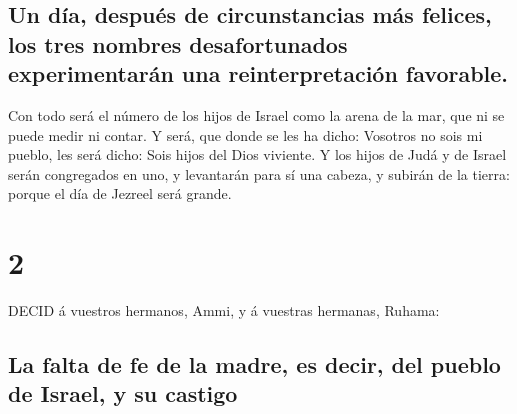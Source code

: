 \hypertarget{un-duxeda-despuuxe9s-de-circunstancias-muxe1s-felices-los-tres-nombres-desafortunados-experimentaruxe1n-una-reinterpretaciuxf3n-favorable.}{%
\subsection{Un día, después de circunstancias más felices, los tres
nombres desafortunados experimentarán una reinterpretación
favorable.}\label{un-duxeda-despuuxe9s-de-circunstancias-muxe1s-felices-los-tres-nombres-desafortunados-experimentaruxe1n-una-reinterpretaciuxf3n-favorable.}}

 Con todo será el número de los hijos de Israel como la
arena de la mar, que ni se puede medir ni contar. Y será, que donde se
les ha dicho: Vosotros no sois mi pueblo, les será dicho: Sois hijos del
Dios viviente.  Y los hijos de Judá y de Israel serán
congregados en uno, y levantarán para sí una cabeza, y subirán de la
tierra: porque el día de Jezreel será grande.

\hypertarget{section-1}{%
\section{2}\label{section-1}}

 DECID á vuestros hermanos, Ammi, y á vuestras hermanas,
Ruhama:

\hypertarget{la-falta-de-fe-de-la-madre-es-decir-del-pueblo-de-israel-y-su-castigo}{%
\subsection{La falta de fe de la madre, es decir, del pueblo de Israel,
y su
castigo}\label{la-falta-de-fe-de-la-madre-es-decir-del-pueblo-de-israel-y-su-castigo}}

